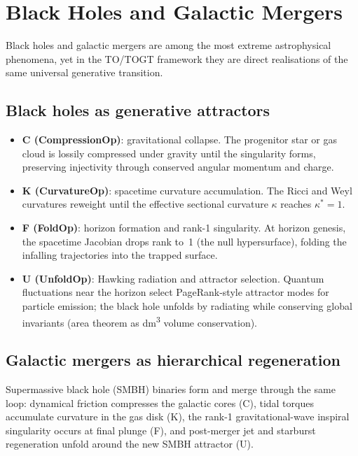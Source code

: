\chapter{Black Holes and Galactic Mergers}

Black holes and galactic mergers are among the most extreme astrophysical phenomena, yet in the TO/TOGT framework they are direct realisations of the same universal generative transition.

\section{Black holes as generative attractors}

\begin{itemize}
\item \textbf{C (CompressionOp)}: gravitational collapse. The progenitor star or gas cloud is lossily compressed under gravity until the singularity forms, preserving injectivity through conserved angular momentum and charge.
\item \textbf{K (CurvatureOp)}: spacetime curvature accumulation. The Ricci and Weyl curvatures reweight until the effective sectional curvature \(\kappa\) reaches \(\kappa^* = 1\).
\item \textbf{F (FoldOp)}: horizon formation and rank-1 singularity. At horizon genesis, the spacetime Jacobian drops rank to~1 (the null hypersurface), folding the infalling trajectories into the trapped surface.
\item \textbf{U (UnfoldOp)}: Hawking radiation and attractor selection. Quantum fluctuations near the horizon select PageRank-style attractor modes for particle emission; the black hole unfolds by radiating while conserving global invariants (area theorem as dm\textsuperscript{3} volume conservation).
\end{itemize}

\section{Galactic mergers as hierarchical regeneration}

Supermassive black hole (SMBH) binaries form and merge through the same loop: dynamical friction compresses the galactic cores (C), tidal torques accumulate curvature in the gas disk (K), the rank-1 gravitational-wave inspiral singularity occurs at final plunge (F), and post-merger jet and starburst regeneration unfold around the new SMBH attractor (U).

